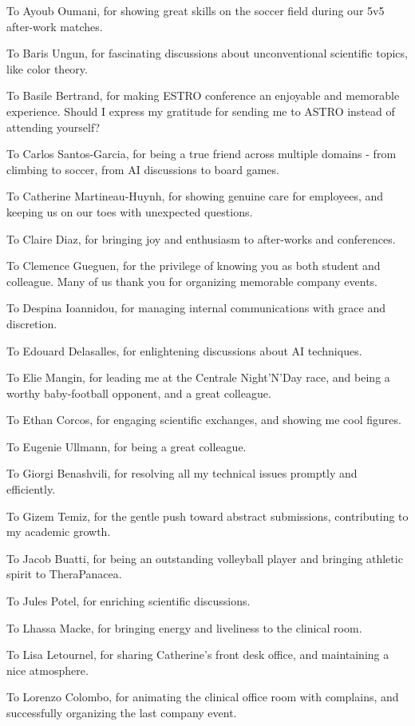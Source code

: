 To Ayoub Oumani, for showing great skills on the soccer field during our 5v5 after-work matches.

To Baris Ungun, for fascinating discussions about unconventional scientific topics, like color theory.

To Basile Bertrand, for making ESTRO conference an enjoyable and memorable experience.
Should I express my gratitude for sending me to ASTRO instead of attending yourself?

To Carlos Santos-Garcia, for being a true friend across multiple domains - from climbing to soccer, from AI discussions to board games.

To Catherine Martineau-Huynh, for showing genuine care for employees, and keeping us on our toes with unexpected questions.

To Claire Diaz, for bringing joy and enthusiasm to after-works and conferences.

To Clemence Gueguen, for the privilege of knowing you as both student and colleague.
Many of us thank you for organizing memorable company events.

To Despina Ioannidou, for managing internal  communications with grace and discretion.

To Edouard Delasalles, for enlightening discussions about AI techniques.

To Elie Mangin, for leading me at the Centrale Night'N'Day race, and being a worthy baby-football opponent, and a great colleague.

To Ethan Corcos, for engaging scientific exchanges, and showing me cool figures.

To Eugenie Ullmann, for being a great colleague.

To Giorgi Benashvili, for resolving all my technical issues promptly and efficiently.

To Gizem Temiz, for the gentle push toward abstract submissions, contributing to my academic growth.

To Jacob Buatti, for being an outstanding volleyball player and bringing athletic spirit to TheraPanacea.

To Jules Potel, for enriching scientific discussions.

To Lhassa Macke, for bringing energy and liveliness to the clinical room.

To Lisa Letournel, for sharing Catherine's front desk office, and maintaining a nice atmosphere.

To Lorenzo Colombo, for animating the clinical office room with complains, and successfully organizing the last company event.

